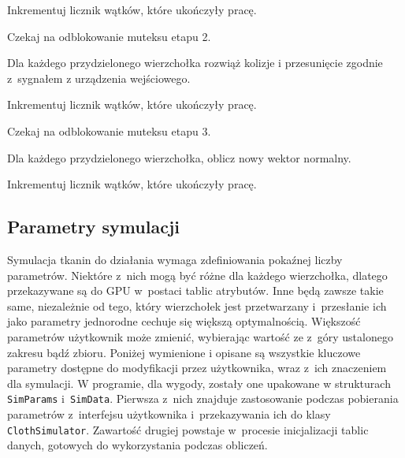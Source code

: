 \begin{algorithm}[H]
{				Inkrementuj licznik wątków, które ukończyły pracę.
				
				Czekaj na odblokowanie muteksu etapu 2.
				
				Dla każdego przydzielonego wierzchołka rozwiąż kolizje i przesunięcie zgodnie z~sygnałem z urządzenia wejściowego.
				
				Inkrementuj licznik wątków, które ukończyły pracę.
				
				Czekaj na odblokowanie muteksu etapu 3.
				
				Dla każdego przydzielonego wierzchołka, oblicz nowy wektor normalny.
				
				Inkrementuj licznik wątków, które ukończyły pracę.
			}
			
			\Indm
		\end{algorithm}
		
		\subsection{Parametry symulacji}
		\label{t:symulacja:dzialanie:parametry}
			
		
		Symulacja tkanin do działania wymaga zdefiniowania pokaźnej liczby parametrów. Niektóre z~nich mogą być różne dla każdego wierzchołka, dlatego przekazywane są do GPU w~postaci tablic atrybutów. Inne będą zawsze takie same, niezależnie od tego, który wierzchołek jest przetwarzany i~przesłanie ich jako parametry jednorodne cechuje się większą optymalnością. Większość parametrów użytkownik może zmienić, wybierając wartość ze z~góry ustalonego zakresu bądź zbioru. Poniżej wymienione i opisane są wszystkie kluczowe parametry dostępne do modyfikacji przez użytkownika, wraz z~ich znaczeniem dla symulacji. W programie, dla wygody, zostały one upakowane w strukturach \texttt{SimParams} i~\texttt{SimData}. Pierwsza z~nich znajduje zastosowanie podczas pobierania parametrów z~interfejsu użytkownika i~przekazywania ich do klasy \texttt{ClothSimulator}. Zawartość drugiej powstaje w~procesie inicjalizacji tablic danych, gotowych do wykorzystania podczas obliczeń.
		
